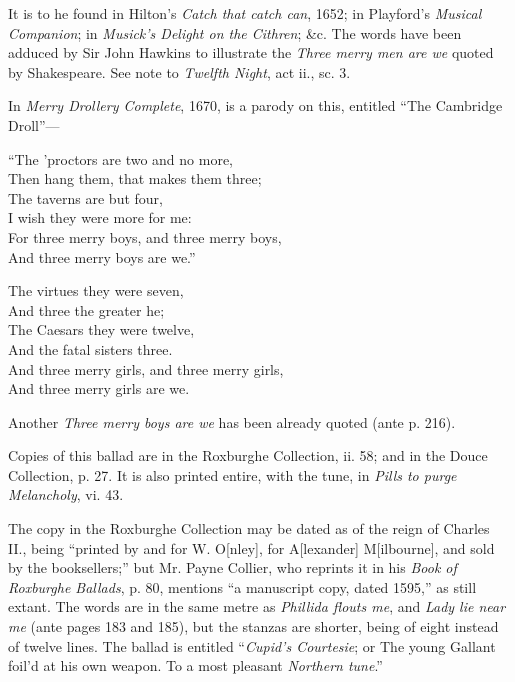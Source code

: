 It is to he found in Hilton’s \textit{Catch that catch can}, 1652; in Playford’s \textit{Musical
Companion}; in \textit{Musick’s Delight on the Cithren}; \&c. The words have been
adduced by Sir John Hawkins to illustrate the \textit{Three merry men are we} quoted
by Shakespeare. See note to \textit{Twelfth Night}, act ii., sc. 3.

In \textit{Merry Drollery Complete}, 1670, is a parody on this, entitled “The Cambridge
Droll”—
\begin{dcverse}\settowidth{\versewidth}{101100}
\begin{patverse}
\vin “The ’proctors are two and no more,\\
Then hang them, that makes them three;\\
The taverns are but four,\\
\vin I wish they were more for me:\\
For three merry boys, and three merry boys,\\
And three merry boys are we.”
\end{patverse}
\end{dcverse}

\pagebreak%



\settowidth{\versewidth}{And three merry girls, and three merry girls,}
\begin{dcverse}\begin{altverse}
The virtues they were seven,\\
And three the greater he;\\
The Caesars they were twelve,\\
And the fatal sisters three.\\
And three merry girls, and three merry girls,\\
And three merry girls are we.
\end{altverse}
\end{dcverse}

Another \textit{Three merry boys are we} has been already quoted (ante p. 216).


Copies of this ballad are in the Roxburghe Collection, ii. 58; and in the Douce
Collection, p. 27. It is also printed entire, with the tune, in \textit{Pills to purge
Melancholy}, vi. 43.

The copy in the Roxburghe Collection may be dated as of the reign of
Charles II., being “printed by and for W. O[nley], for A[lexander] M[ilbourne],
and sold by the booksellers;” but Mr. Payne Collier, who reprints it in his \textit{Book
of Roxburghe Ballads}, p. 80, mentions “a manuscript copy, dated 1595,” as still
extant. The words are in the same metre as \textit{Phillida flouts me}, and \textit{Lady lie near
me} (ante pages 183 and 185), but the stanzas are shorter, being of eight instead
of twelve lines. The ballad is entitled “\textit{Cupid’s Courtesie}; or The young Gallant
foil’d at his own weapon. To a most pleasant \textit{Northern tune}.”

